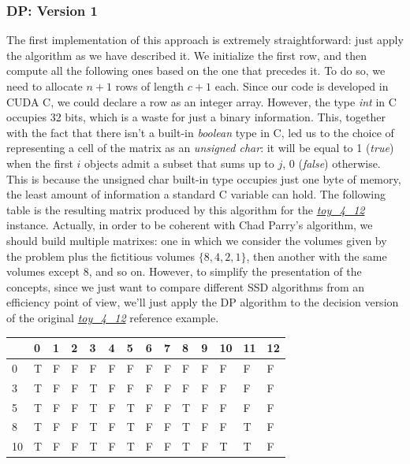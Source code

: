 \documentclass[12pt]{extarticle}
\begin{document}
\subsubsection{DP: Version 1}
The first implementation of this approach is extremely straightforward: just apply the algorithm as we have described it. We initialize the first row, and then compute all the following ones based on the one that precedes it. To do so, we need to allocate $n+1$ rows of length $c+1$ each. Since our code is developed in CUDA C, we could declare a row as an integer array. However, the type \emph{int} in C occupies 32 bits, which is a waste for just a binary information. This, together with the fact that there isn't a built-in \emph{boolean} type in C, led us to the choice of representing a cell of the matrix as an \emph{unsigned char}: it will be equal to 1 (\emph{true}) when the first $i$ objects admit a subset that sums up to $j$, 0 (\emph{false}) otherwise. This is because the unsigned char built-in type occupies just one byte of memory, the least amount of information a standard C variable can hold. The following table is the resulting matrix produced by this algorithm for the \hyperref[marker-toy-4-12]{\emph{toy\_4\_12}} instance.\newline
Actually, in order to be coherent with Chad Parry's algorithm, we should build multiple matrixes: one in which we consider the volumes given by the problem plus the fictitious volumes $\{8, 4, 2, 1\}$, then another with the same volumes except 8, and so on. However, to simplify the presentation of the concepts, since we just want to compare different SSD algorithms from an efficiency point of view, we'll just apply the DP algorithm to the decision version of the original \hyperref[marker-toy-4-12]{\emph{toy\_4\_12}} reference example.\newline
\begin{center}
\begin{tabular}{| m{0.6cm} | m{0.6cm}| m{0.6cm} | m{0.6cm} | m{0.6cm} | m{0.6cm} | m{0.6cm} | m{0.6cm} | m{0.6cm}| m{0.6cm} | m{0.6cm} | m{0.6cm} | m{0.6cm} | m{0.6cm} |}
 \hline
 & 0 & 1 & 2 & 3 & 4 & 5 & 6 & 7 & 8 & 9 & 10 & 11 & 12\\
 \hline
0 & T & F & F & F & F & F & F & F & F & F & F & F & F\\
\hline
3 & T & F & F & T & F & F & F & F & F & F & F & F & F\\
\hline
5 & T & F & F & T & F & T & F & F & T & F & F & F & F\\
\hline
8 & T & F & F & T & F & T & F & F & T & F & F & T & F\\
\hline
10 & T & F & F & T & F & T & F & F & T & F & T & T & F\\
\hline
\end{tabular}
\end{center}
\end{document}
